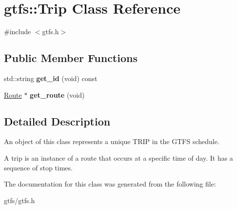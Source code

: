 \hypertarget{classgtfs_1_1Trip}{}\section{gtfs\+:\+:Trip Class Reference}
\label{classgtfs_1_1Trip}


{\ttfamily \#include $<$gtfs.\+h$>$}

\subsection*{Public Member Functions}
\begin{DoxyCompactItemize}
\item 
\mbox{\label{classgtfs_1_1Trip_ac4c80cbf34f7c715104cc1c33b082f58}} 
std\+::string {\bfseries get\+\_\+id} (void) const
\item 
\mbox{\label{classgtfs_1_1Trip_a8181ea60bc504255a7a7c0850cc35575}} 
\hyperlink{classgtfs_1_1Route}{Route} $\ast$ {\bfseries get\+\_\+route} (void)
\end{DoxyCompactItemize}


\subsection{Detailed Description}
An object of this class represents a unique T\+R\+IP in the G\+T\+FS schedule.

A trip is an instance of a route that occurs at a specific time of day. It has a sequence of stop times. 

The documentation for this class was generated from the following file\+:\begin{DoxyCompactItemize}
\item 
gtfs/gtfs.\+h\end{DoxyCompactItemize}

